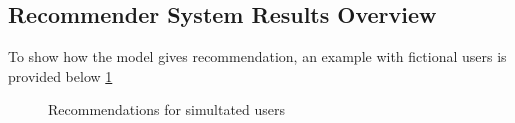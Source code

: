 \documentclass[10pt,twocolumn,letterpaper]{article}
\begin{document}
\subsection{Recommender System Results Overview}
To show how the model gives recommendation, an example with fictional users is provided below \ref{fig:results}

\begin{figure}[H]
       \centering
       \caption{Recommendations for simultated users}
    \label{fig:results}
\end{figure}
\end{document}
